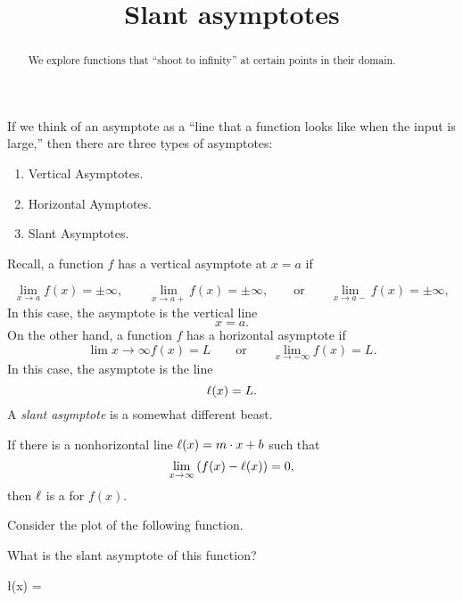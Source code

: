 \documentclass{ximera}
\title[Dig-In:]{Slant asymptotes}
\begin{document}
\begin{abstract}
We explore functions that ``shoot to infinity'' at certain points in
their domain.
\end{abstract}
\maketitle

If we think of an asymptote as a ``line that a function looks like
when the input is large,'' then there are three types of asymptotes:
\begin{enumerate}
\item Vertical Asymptotes.
\item Horizontal Aymptotes.
\item Slant Asymptotes.
\end{enumerate}

Recall, a function $f$ has a vertical asymptote at $x=a$ if

\[
\lim_{x\to a} f(x) = \pm\infty, \qquad \lim_{x\to a+} f(x) = \pm\infty, \qquad\text{or}\qquad \lim_{x\to a-} f(x) = \pm\infty,
\]
In this case, the asymptote is the vertical line
\[
x = a.
\]
On the other hand, a function $f$ has a horizontal asymptote if
\[
\lim{x\to \infty} f(x) = L \qquad\text{or}\qquad \lim_{x\to -\infty}
f(x) = L.
\]
In this case, the asymptote is the line
\[
\ell(x) = L.
\]
A \textit{slant asymptote} is a somewhat different beast.

\begin{definition}
  If there is a nonhorizontal line $\ell(x) = m\cdot x+b$ such that
  \[
  \lim_{x\to \infty}\left(f(x) - \l(x)\right) = 0,
  \]
  then $\ell$ is a  for $f(x)$.
\end{definition}
\begin{question}
  Consider the plot of the following function. 
  \begin{image}
  \end{image}
  What is the slant asymptote of this function?
  \begin{prompt}
    \l(x) = 
  \end{prompt}
\end{question}
\end{document}
